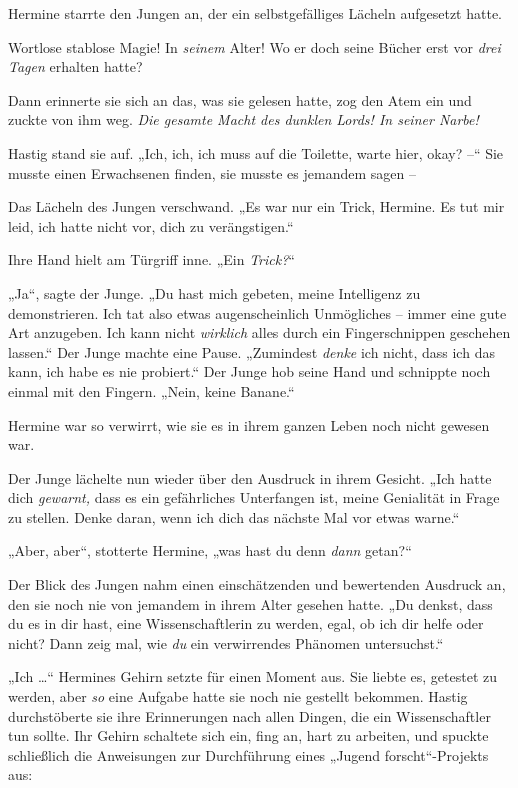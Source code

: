 {Hermine starrte den Jungen an, der ein selbstgefälliges Lächeln aufgesetzt hatte.

Wortlose stablose Magie! In \emph{seinem} Alter! Wo er doch seine Bücher erst vor \emph{drei Tagen} erhalten hatte?

Dann erinnerte sie sich an das, was sie gelesen hatte, zog den Atem ein und zuckte von ihm weg. \emph{Die gesamte Macht des dunklen Lords! In seiner Narbe!}

Hastig stand sie auf. „Ich, ich, ich muss auf die Toilette, warte hier, okay? --“ Sie musste einen Erwachsenen finden, sie musste es jemandem sagen --

Das Lächeln des Jungen verschwand. „Es war nur ein Trick, Hermine. Es tut mir leid, ich hatte nicht vor, dich zu verängstigen.“

Ihre Hand hielt am Türgriff inne. „Ein \emph{Trick?}“

„Ja“, sagte der Junge. „Du hast mich gebeten, meine Intelligenz zu demonstrieren. Ich tat also etwas augenscheinlich Unmögliches -- immer eine gute Art anzugeben. Ich kann nicht \emph{wirklich} alles durch ein Fingerschnippen geschehen lassen.“ Der Junge machte eine Pause. „Zumindest \emph{denke} ich nicht, dass ich das kann, ich habe es nie probiert.“ Der Junge hob seine Hand und schnippte noch einmal mit den Fingern. „Nein, keine Banane.“

Hermine war so verwirrt, wie sie es in ihrem ganzen Leben noch nicht gewesen war.

Der Junge lächelte nun wieder über den Ausdruck in ihrem Gesicht. „Ich hatte dich \emph{gewarnt,} dass es ein gefährliches Unterfangen ist, meine Genialität in Frage zu stellen. Denke daran, wenn ich dich das nächste Mal vor etwas warne.“

„Aber, aber“, stotterte Hermine, „was hast du denn \emph{dann} getan?“

Der Blick des Jungen nahm einen einschätzenden und bewertenden Ausdruck an, den sie noch nie von jemandem in ihrem Alter gesehen hatte. „Du denkst, dass du es in dir hast, eine Wissenschaftlerin zu werden, egal, ob ich dir helfe oder nicht? Dann zeig mal, wie \emph{du} ein verwirrendes Phänomen untersuchst.“

„Ich …“ Hermines Gehirn setzte für einen Moment aus. Sie liebte es, getestet zu werden, aber \emph{so} eine Aufgabe hatte sie noch nie gestellt bekommen. Hastig durchstöberte sie ihre Erinnerungen nach allen Dingen, die ein Wissenschaftler tun sollte. Ihr Gehirn schaltete sich ein, fing an, hart zu arbeiten, und spuckte schließlich die Anweisungen zur Durchführung eines „Jugend forscht“-Projekts aus:

}
